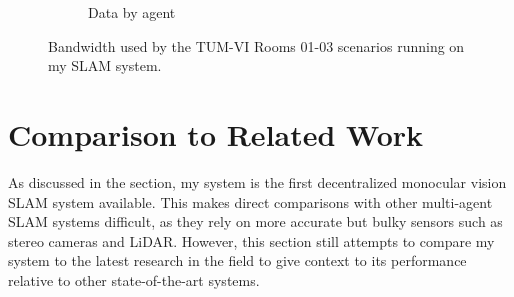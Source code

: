 \begin{figure}[h]
\begin{subfigure}[b]{0.45\linewidth}
        \caption{Data by agent}
    \end{subfigure}%

    \caption{Bandwidth used by the TUM-VI Rooms 01-03 scenarios running on my SLAM system.}
    \label{fig:tum-rooms-01-03-bandwith}
\end{figure}


\section{Comparison to Related Work}
\label{sec:comparison-to-related-work}

As discussed in the  section, my system is the first decentralized monocular vision SLAM system available. This makes direct comparisons with other multi-agent SLAM systems difficult, as they rely on more accurate but bulky sensors such as stereo cameras and LiDAR. However, this section still attempts to compare my system to the latest research in the field to give context to its performance relative to other state-of-the-art systems.

